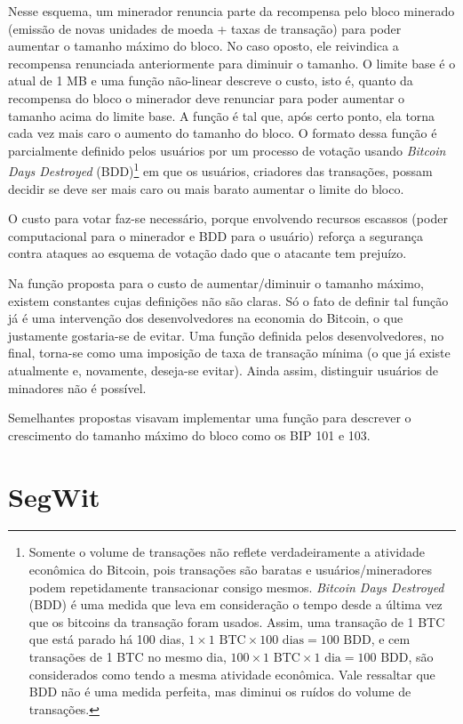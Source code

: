 Nesse esquema, um minerador renuncia parte da recompensa pelo bloco minerado (emissão de novas unidades de moeda + taxas de transação) para poder aumentar o tamanho máximo do bloco. No caso oposto, ele reivindica a recompensa renunciada anteriormente para diminuir o tamanho. O limite base é o atual de 1 MB e uma função não-linear descreve o custo, isto é, quanto da recompensa do bloco o minerador deve renunciar para poder aumentar o tamanho acima do limite base. A função é tal que, após certo ponto, ela torna cada vez mais caro o aumento do tamanho do bloco. O formato dessa função é parcialmente definido pelos usuários por um processo de votação usando \textit{Bitcoin Days Destroyed} (BDD)\footnote{Somente o volume de transações não reflete verdadeiramente a atividade econômica do Bitcoin, pois transações são baratas e usuários/mineradores podem repetidamente transacionar consigo mesmos. \textit{Bitcoin Days Destroyed} (BDD) é uma medida que leva em consideração o tempo desde a última vez que os bitcoins da transação foram usados. Assim, uma transação de 1 BTC que está parado há 100 dias, $1 \times 1 \text{ BTC} \times 100 \text{ dias} = 100 \text{ BDD}$, e cem transações de 1 BTC no mesmo dia, $100 \times 1 \text{ BTC} \times 1 \text{ dia} = 100 \text{ BDD}$, são considerados como tendo a mesma atividade econômica. Vale ressaltar que BDD não é uma medida perfeita, mas diminui os ruídos do volume de transações.} em que os usuários, criadores das transações, possam decidir se deve ser mais caro ou mais barato aumentar o limite do bloco.

O custo para votar faz-se necessário, porque envolvendo recursos escassos (poder computacional para o minerador e BDD para o usuário) reforça a segurança contra ataques ao esquema de votação dado que o atacante tem prejuízo.

Na função proposta para o custo de aumentar/diminuir o tamanho máximo, existem constantes cujas definições não são claras. Só o fato de definir tal função já é uma intervenção dos desenvolvedores na economia do Bitcoin, o que justamente gostaria-se de evitar. Uma função definida pelos desenvolvedores, no final, torna-se como uma imposição de taxa de transação mínima (o que já existe atualmente e, novamente, deseja-se evitar). Ainda assim, distinguir usuários de minadores não é possível.

Semelhantes propostas visavam implementar uma função para descrever o crescimento do tamanho máximo do bloco como os BIP 101 e 103.

\section{SegWit}

